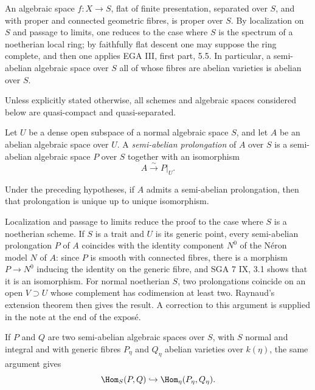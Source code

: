 An algebraic space $f:X\to S$, flat of finite presentation, separated over $S$, and with proper and connected geometric fibres, is proper over $S$. By localization on $S$ and passage to limits, one reduces to the case where $S$ is the spectrum of a noetherian local ring; by faithfully flat descent one may suppose the ring complete, and then one applies EGA III, first part, 5.5. In particular, a semi-abelian algebraic space over $S$ all of whose fibres are abelian varieties is abelian over $S$.

Unless explicitly stated otherwise, all schemes and algebraic spaces considered below are quasi-compact and quasi-separated.

Let $U$ be a dense open subspace of a normal algebraic space $S$, and let $A$ be an abelian algebraic space over $U$. A \emph{semi-abelian prolongation} of $A$ over $S$ is a semi-abelian algebraic space $P$ over $S$ together with an isomorphism
\[
  A \xrightarrow{\sim} P|_U .
\]

\begin{theorem}[Raynaud]\label{thm:raynaud}
Under the preceding hypotheses, if $A$ admits a semi-abelian prolongation, then that prolongation is unique up to unique isomorphism.
\end{theorem}

Localization and passage to limits reduce the proof to the case where $S$ is a noetherian scheme. If $S$ is a trait and $U$ is its generic point, every semi-abelian prolongation $P$ of $A$ coincides with the identity component $N^0$ of the Néron model $N$ of $A$: since $P$ is smooth with connected fibres, there is a morphism $P\to N^0$ inducing the identity on the generic fibre, and SGA 7 IX, 3.1 shows that it is an isomorphism. For normal noetherian $S$, two prolongations coincide on an open $V\supset U$ whose complement has codimension at least two. Raynaud's extension theorem then gives the result. A correction to this argument is supplied in the note at the end of the exposé.

\begin{remark}
If $P$ and $Q$ are two semi-abelian algebraic spaces over $S$, with $S$ normal and integral and with generic fibres $P_\eta$ and $Q_\eta$ abelian varieties over $k(\eta)$, the same argument gives
\[
  \Hom_S(P,Q) \hookrightarrow \Hom_\eta(P_\eta,Q_\eta).
\]
\end{remark}

